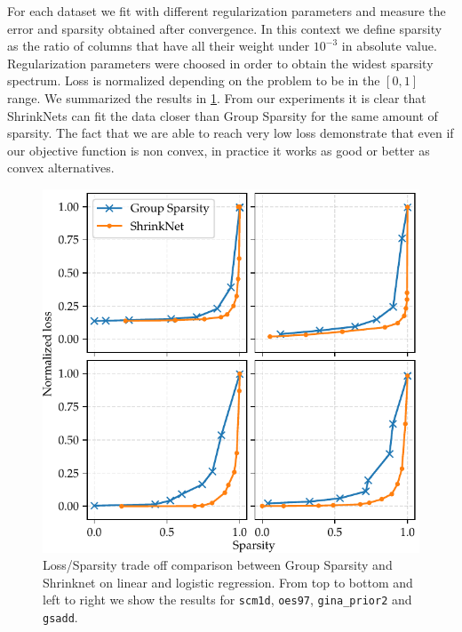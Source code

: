 For each dataset we fit with different regularization parameters and measure
the error and sparsity obtained after convergence. In this context we define
sparsity as the ratio of columns that have all their weight under $10^{-3}$ in
absolute value. Regularization parameters were choosed in order to obtain the
widest sparsity spectrum. Loss is normalized depending on the problem to be in
the $[0, 1]$ range. We summarized the results in \cref{sparsity_accuracy}. From
our experiments it is clear that ShrinkNets can fit the data closer than Group
Sparsity for the same amount of sparsity. The fact that we are able to reach
very low loss demonstrate that even if our objective function is non convex, in
practice it works as good or better as convex alternatives.
\begin{figure}
\begin{center}
\includegraphics[width=\columnwidth]{regressions}
\vspace*{-5mm}
\caption{\label{sparsity_accuracy}Loss/Sparsity trade off comparison between Group Sparsity and Shrinknet on linear and logistic regression. From top to bottom and left to right we show the results for \texttt{scm1d}, \texttt{oes97}, \texttt{gina\_prior2} and \texttt{gsadd}.}

\end{center}
\vspace*{-4mm}
\end{figure}